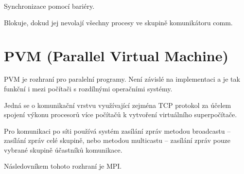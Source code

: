 \begin{compactitem}
    \item {} \begin{compactitem}
        \item Synchronizace pomocí bariéry.
        \item Blokuje, dokud jej nevolají všechny procesy ve skupině komunikátoru comm.
    \end{compactitem}
\end{compactitem}


\section{PVM (Parallel Virtual Machine)}

\begin{compactitem}
    \item PVM je rozhraní pro paralelní programy. Není závislé na implementaci a je tak funkční i mezi počítači s rozdílnými operačními systémy.

    \item Jedná se o komunikační vrstvu využívající zejména TCP protokol za účelem spojení výkonu procesorů více počítačů k vytvoření virtuálního superpočítače.

    \item Pro komunikaci po síti používá systém zasílání zpráv metodou broadcastu -- zasílání zpráv celé skupině, nebo metodou multicastu -- zasílání zpráv pouze vybrané skupině účastníků komunikace.

    \item Následovníkem tohoto rozhraní je MPI.
\end{compactitem}
